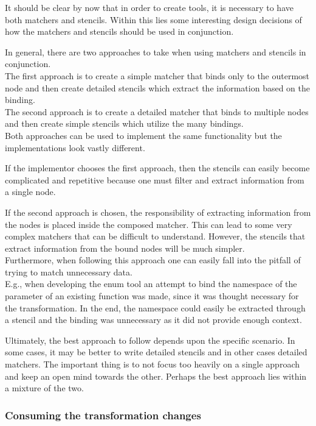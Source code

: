 It should be clear by now that in order to create tools, it is necessary to have both matchers and stencils. Within this lies some interesting design decisions of how the matchers and stencils should be used in conjunction.

In general, there are two approaches to take when using matchers and stencils in conjunction.\\
The first approach is to create a simple matcher that binds only to the outermost node and then create detailed stencils which extract the information based on the binding.\\
The second approach is to create a detailed matcher that binds to multiple nodes and then create simple stencils which utilize the many bindings.\\
Both approaches can be used to implement the same functionality but the implementations look vastly different.

If the implementor chooses the first approach, then the stencils can easily become complicated and repetitive because one must filter and extract information from a single node.

If the second approach is chosen, the responsibility of extracting information from the nodes is placed inside the composed matcher. This can lead to some very complex matchers that can be difficult to understand. However, the stencils that extract information from the bound nodes will be much simpler.\\
Furthermore, when following this approach one can easily fall into the pitfall of trying to match unnecessary data.\\
E.g., when developing the enum tool an attempt to bind the namespace of the parameter of an existing  function was made, since it was thought necessary for the transformation. In the end, the namespace could easily be extracted through a stencil and the binding was unnecessary as it did not provide enough context.

Ultimately, the best approach to follow depends upon the specific scenario. In some cases, it may be better to write detailed stencils and in other cases detailed matchers. The important thing is to not focus too heavily on a single approach and keep an open mind towards the other. Perhaps the best approach lies within a mixture of the two.

\subsubsection*{Consuming the transformation changes} \label{subsubsec:080dev:Consumers}

